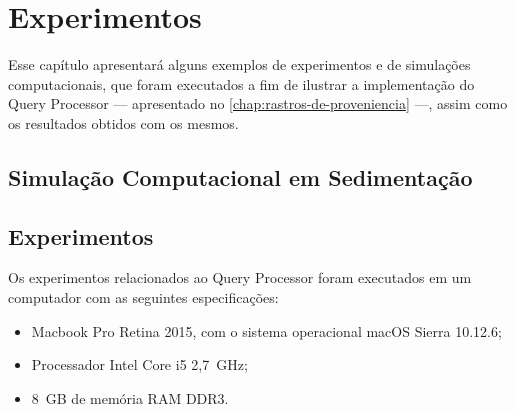 
\chapter{Experimentos}%
\label{chap:experimentos}

Esse capítulo apresentará alguns exemplos de experimentos e de simulações computacionais, que foram executados a fim de ilustrar a implementação do Query Processor --- apresentado no \autoref{chap:rastros-de-proveniencia} ---, assim como os resultados obtidos com os mesmos.

\section{Simulação Computacional em Sedimentação}




\section{Experimentos}

Os experimentos relacionados ao Query Processor foram executados em um computador com as seguintes especificações:

\begin{itemize}
	\item Macbook Pro Retina 2015, com o sistema operacional macOS Sierra 10.12.6;
    \item Processador Intel Core i5 2,7~GHz;
    \item 8~GB de memória RAM DDR3.
\end{itemize}



